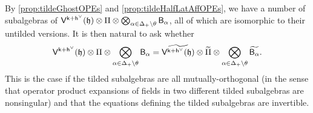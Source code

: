 \documentclass[10pt,a4paper]{amsart}
\numberwithin{equation}{section}
\newcommand{\kk}{\mathsf{k}}   %
\DeclarePairedDelimiter{\brac}{\lparen}{\rparen}   %
\newcommand{\VOA}[1]{\mathsf{#1}}    %
\newcommand{\cartan}{\mathfrak{h}}
\newcommand{\cox}{\mathsf{h}}                                        %
\newcommand{\dcox}{\coroot{\cox}}                                    %
\newcommand{\proots}{\Delta_+}                                       %
\newcommand{\hroot}{\theta}                                          %
\newcommand{\coroot}[1]{#1^{\vee}}                                   %
\newcommand{\uaffvoa}[2]{\VOA{V}^{#1}\brac{#2}}                   %
\newcommand{\bgvoa}{\VOA{B}}                                      %
\theoremstyle{plain}
\begin{document}
\noindent By \cref{prop:tildeGhostOPEs} and \cref{prop:tildeHalfLatAffOPEs}, we have a number of subalgebras of $\uaffvoa{\kk+\dcox}{\cartan} \otimes \Pi \otimes \bigotimes_{\alpha \in \proots \setminus \hroot} \bgvoa_\alpha$, all of which are isomorphic to their untilded versions. It is then natural to ask whether
%
\begin{equation} \label{eq:FreeFieldIso}
    \uaffvoa{\kk+\dcox}{\cartan} \otimes \Pi  \otimes \bigotimes_{\alpha \in \proots \setminus \hroot} \bgvoa_\alpha= 
    \widetilde{\uaffvoa{\kk+\dcox}{\cartan}} \otimes \widetilde{\Pi} \otimes \bigotimes_{\alpha \in \proots \setminus \hroot} \widetilde{\bgvoa_\alpha}.
\end{equation}
%
This is the case if the tilded subalgebras are all mutually-orthogonal (in the sense that operator product expansions of fields in two different tilded subalgebras are nonsingular) and that the equations defining the tilded subalgebras are invertible. 
\end{document}
